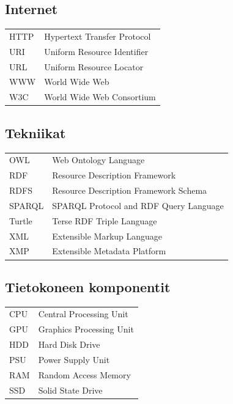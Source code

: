 \documentclass[finnish, 12pt, a4paper, elec, utf8, pdfa, online]{aaltothesis}
\begin{document}
\thesistableofcontents



\subsection*{Internet}
\begin{tabular}{ll}
HTTP         & Hypertext Transfer Protocol \\
URI          & Uniform Resource Identifier \\
URL          & Uniform Resource Locator \\
WWW          & World Wide Web \\
W3C          & World Wide Web Consortium \\
\end{tabular}

\subsection*{Tekniikat}
\begin{tabular}{ll}
OWL          & Web Ontology Language \\
RDF          & Resource Description Framework \\
RDFS         & Resource Description Framework Schema\\
SPARQL       & SPARQL Protocol and RDF Query Language \\
Turtle       & Terse RDF Triple Language \\
XML          & Extensible Markup Language \\
XMP          & Extensible Metadata Platform \\
\end{tabular}


\subsection*{Tietokoneen komponentit}
\begin{tabular}{ll}
CPU          & Central Processing Unit \\
GPU          & Graphics Processing Unit \\
HDD          & Hard Disk Drive \\
PSU          & Power Supply Unit \\
RAM          & Random Access Memory \\
SSD          & Solid State Drive \\
\end{tabular}
\end{document}
